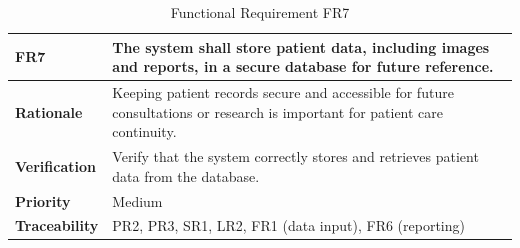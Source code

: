 \documentclass[12pt]{article}
\begin{document}
\begin{table}[h!]
\centering
{}
\begin{tabular}{|p{3.5cm}|p{11.5cm}|}
\hline
\rowcolor{gray!30}
\textbf{FR7} & The system shall store patient data, including images and reports, in a secure database for future reference. \\
\hline
\textbf{Rationale} & Keeping patient records secure and accessible for future consultations or research is important for patient care continuity. \\
\hline
\textbf{Verification} & Verify that the system correctly stores and retrieves patient data from the database. \\
\hline
\textbf{Priority} & Medium \\
\hline
\textbf{Traceability} & PR2, PR3, SR1, LR2, FR1 (data input), FR6 (reporting) \\
\hline
\end{tabular}
\caption{Functional Requirement FR7}
\end{table}
\end{document}
